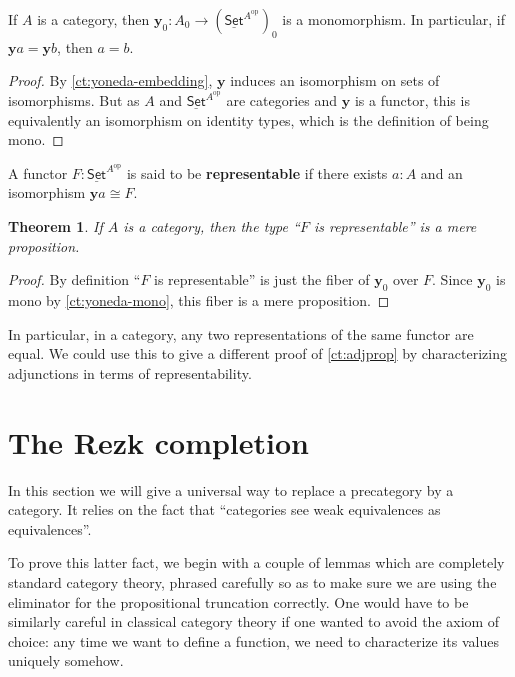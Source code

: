 \documentclass{amsart}
\renewcommand{\set}{\ensuremath{\mathsf{Set}}\xspace}
\newcommand{\uset}{\ensuremath{\underline{\set}}\xspace}
\newtheorem{thm}{Theorem}[section]
\theoremstyle{definition}
\theoremstyle{remark}
\numberwithin{equation}{section}
\newcommand{\op}{^{\textrm{op}}}
\newcommand{\y}{\ensuremath{\mathbf{y}}\xspace}
\begin{document}
\begin{cor}\label{ct:yoneda-mono}
  If $A$ is a category, then $\y_0 : A_0 \to (\uset^{A\op})_0$ is a monomorphism.
  In particular, if $\y a = \y b$, then $a=b$.
\end{cor}
\begin{proof}
  By \autoref{ct:yoneda-embedding}, \y induces an isomorphism on sets of isomorphisms.
  But as $A$ and $\uset^{A\op}$ are categories and \y is a functor, this is equivalently an isomorphism on identity types, which is the definition of being mono.
\end{proof}

\begin{defn}\label{ct:representable}
  A functor $F:\uset^{A\op}$ is said to be \textbf{representable} if there exists $a:A$ and an isomorphism $\y a \cong F$.
\end{defn}

\begin{thm}\label{ct:representable-prop}
  If $A$ is a category, then the type ``$F$ is representable'' is a mere proposition.
\end{thm}
\begin{proof}
  By definition ``$F$ is representable'' is just the fiber of $\y_0$ over $F$.
  Since $\y_0$ is mono by \autoref{ct:yoneda-mono}, this fiber is a mere proposition.
\end{proof}

In particular, in a category, any two representations of the same functor are equal.
We could use this to give a different proof of \autoref{ct:adjprop} by characterizing adjunctions in terms of representability.


\section{The Rezk completion}
\label{sec:rezk}

In this section we will give a universal way to replace a precategory by a category.
It relies on the fact that ``categories see weak equivalences as equivalences''.

To prove this latter fact, we begin with a couple of lemmas which are completely standard category theory, phrased carefully so as to make sure we are using the eliminator for the propositional truncation correctly.
One would have to be similarly careful in classical category theory if one wanted to avoid the axiom of choice: any time we want to define a function, we need to characterize its values uniquely somehow.
\end{document}
